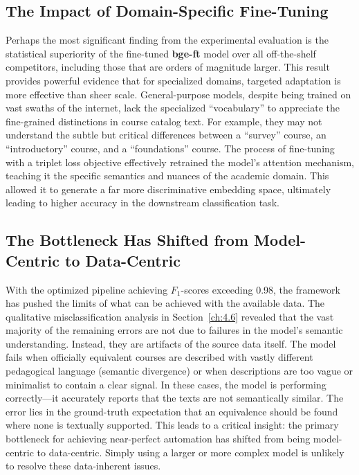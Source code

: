 \subsection{The Impact of Domain-Specific Fine-Tuning}\label{ch:5.1.2}
Perhaps the most significant finding from the experimental evaluation is the statistical superiority of the fine-tuned \textbf{bge-ft} model over all off-the-shelf competitors, including those that are orders of magnitude larger. This result provides powerful evidence that for specialized domains, targeted adaptation is more effective than sheer scale. General-purpose models, despite being trained on vast swaths of the internet, lack the specialized ``vocabulary'' to appreciate the fine-grained distinctions in course catalog text. For example, they may not understand the subtle but critical differences between a ``survey'' course, an ``introductory'' course, and a ``foundations'' course. The process of fine-tuning with a triplet loss objective effectively retrained the model's attention mechanism, teaching it the specific semantics and nuances of the academic domain. This allowed it to generate a far more discriminative embedding space, ultimately leading to higher accuracy in the downstream classification task.

\subsection{The Bottleneck Has Shifted from Model-Centric to Data-Centric}\label{ch:5.1.3}
With the optimized pipeline achieving \(F_1\)-scores exceeding 0.98, the framework has pushed the limits of what can be achieved with the available data. The qualitative misclassification analysis in Section~\ref{ch:4.6} revealed that the vast majority of the remaining errors are not due to failures in the model's semantic understanding. Instead, they are artifacts of the source data itself. The model fails when officially equivalent courses are described with vastly different pedagogical language (semantic divergence) or when descriptions are too vague or minimalist to contain a clear signal. In these cases, the model is performing correctly—it accurately reports that the texts are not semantically similar. The error lies in the ground-truth expectation that an equivalence should be found where none is textually supported.  This leads to a critical insight: the primary bottleneck for achieving near-perfect automation has shifted from being model-centric to data-centric. Simply using a larger or more complex model is unlikely to resolve these data-inherent issues. 

